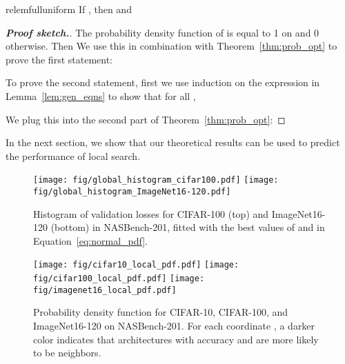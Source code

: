 \begin{restatable}{relem}{fulluniform}\label{lem:full_uniform}
If ,
then  and

\end{restatable}

\begin{proof}[\textbf{Proof sketch.}]
The probability density function of  is equal to 1 on  and 0 otherwise.
Then 
We use this in combination with Theorem~\ref{thm:prob_opt} to prove the first statement:


To prove the second statement, first
we use induction on the expression in Lemma~\ref{lem:gen_eqns}
to show that for all , 

We plug this into the second part of Theorem~\ref{thm:prob_opt}:

\end{proof}

In the next section, we show that our theoretical results can be used to
predict the performance of local search.




\begin{figure}
\centering \texttt{[image: fig/global\_histogram\_cifar100.pdf]}
\texttt{[image: fig/global\_histogram\_ImageNet16-120.pdf]}
\caption{
Histogram of validation losses for CIFAR-100 (top) and ImageNet16-120 (bottom) 
in NASBench-201,
fitted with the best values of  and  in Equation~\ref{eq:normal_pdf}.
}
\label{fig:single_histogram}
\end{figure}

\begin{figure*}
\centering \texttt{[image: fig/cifar10\_local\_pdf.pdf]}
\texttt{[image: fig/cifar100\_local\_pdf.pdf]}
\texttt{[image: fig/imagenet16\_local\_pdf.pdf]}
\caption{
Probability density function for CIFAR-10, CIFAR-100, and
ImageNet16-120 on NASBench-201. For each coordinate , a darker color indicates
that architectures with accuracy  and  are more likely to be neighbors.
}
\label{fig:201_local_pdfs}
\end{figure*}


